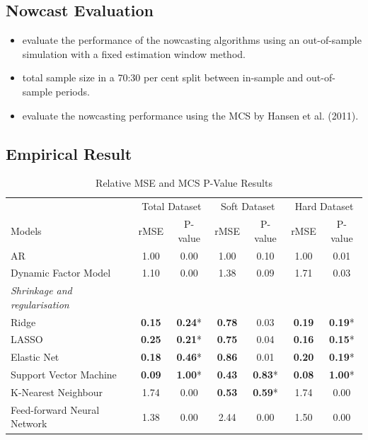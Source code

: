 \documentclass[thesis]{hmcposter}
\begin{document}
\begin{poster}
\subsection{Nowcast Evaluation}
\begin{itemize}
    \item evaluate the performance of the nowcasting algorithms using an out-of-sample simulation with a fixed estimation window method.
    \item total sample size in a 70:30 per cent split between in-sample and out-of-sample periods.
    \item evaluate the nowcasting performance using the MCS by Hansen et al. (2011).
\end{itemize}
\subsection{Empirical Result}
\begin{table}
\begin{small}
\caption{Relative MSE and MCS P-Value Results}
\begin{tabular}{lcc|cc|cc}
\toprule
       & \multicolumn{2}{c}{Total Dataset} & \multicolumn{2}{c}{Soft Dataset} & \multicolumn{2}{c}{Hard Dataset}\\ \cline{2-7} 
\rule{0pt}{3ex}  
Models & rMSE & P-value & rMSE & P-value& rMSE  & P-value \\
\rowcolor{Gray}
AR & 1.00 & 0.00 & 1.00 & 0.10 & 1.00 & 0.01 \\ 
\rowcolor{Gray}
Dynamic Factor Model & 1.10 & 0.00 & 1.38 & 0.09 & 1.71 & 0.03 \\ 
\textit{Shrinkage and regularisation} & & & & & & \\ 
  Ridge & \textbf{0.15} & \textbf{0.24}* & \textbf{0.78} & 0.03 & \textbf{0.19} & \textbf{0.19}* \\ 
  LASSO & \textbf{0.25} & \textbf{0.21}* & \textbf{0.75} & 0.04 & \textbf{0.16} & \textbf{0.15}* \\ 
  Elastic Net & \textbf{0.18} & \textbf{0.46}* & \textbf{0.86} & 0.01 & \textbf{0.20} & \textbf{0.19}* \\ 
  Support Vector Machine & \textbf{0.09} & \textbf{1.00}* & \textbf{0.43} & \textbf{0.83}* & \textbf{0.08} & \textbf{1.00}* \\ 
  \rowcolor{Gray}
  K-Nearest Neighbour & 1.74 & 0.00 & \textbf{0.53} & \textbf{0.59}* & 1.74 & 0.00 \\ 
  \rowcolor{Gray}
  Feed-forward Neural Network & 1.38 & 0.00 & 2.44 & 0.00 & 1.50 & 0.00 \\ 

\end{tabular}
\end{small}
\end{table}
\end{poster}
\end{document}
